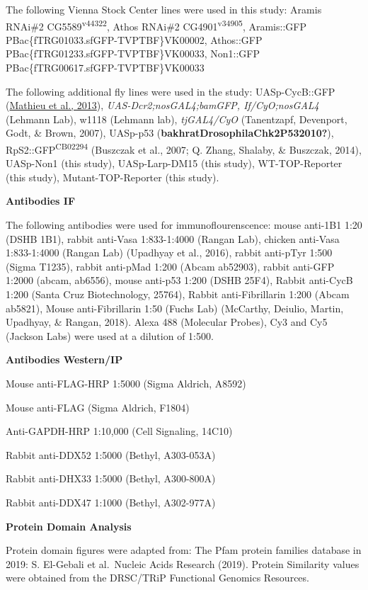 \documentclass[12pt,oneside]{reedthesis}
\begin{document}
The following Vienna Stock Center lines were used in this study: Aramis
RNAi\#2 CG5589\textsuperscript{v44322}, Athos RNAi\#2 CG4901\textsuperscript{v34905}, Aramis::GFP
PBac\{fTRG01033.sfGFP-TVPTBF\}VK00002, Athos::GFP
PBac\{fTRG01233.sfGFP-TVPTBF\}VK00033, Non1::GFP
PBac\{fTRG00617.sfGFP-TVPTBF\}VK00033

The following additional fly lines were used in the study:
UASp-CycB::GFP (\href{https://www.ncbi.nlm.nih.gov/pmc/articles/PMC5830152/\#R25}{Mathieu et al.,
2013}),
\emph{UAS-Dcr2;nosGAL4;bamGFP, If/CyO;nosGAL4} (Lehmann Lab), w1118 (Lehmann
lab),
\emph{tjGAL4/CyO} (Tanentzapf, Devenport, Godt, \& Brown, 2007),
UASp-p53 (\textbf{bakhratDrosophilaChk2P532010?}), RpS2::GFP\textsuperscript{CB02294}
(Buszczak et al., 2007; Q. Zhang, Shalaby, \& Buszczak, 2014), UASp-Non1 (this
study), UASp-Larp-DM15 (this study), WT-TOP-Reporter (this study),
Mutant-TOP-Reporter (this study).

\textbf{Antibodies IF}

The following antibodies were used for immunoflourenscence: mouse
anti-1B1 1:20 (DSHB 1B1), rabbit anti-Vasa 1:833-1:4000 (Rangan Lab),
chicken anti-Vasa 1:833-1:4000 (Rangan Lab)
(Upadhyay et al., 2016), rabbit anti-pTyr
1:500 (Sigma T1235), rabbit anti-pMad 1:200 (Abcam ab52903), rabbit
anti-GFP 1:2000 (abcam, ab6556), mouse anti-p53 1:200 (DSHB 25F4),
Rabbit anti-CycB 1:200 (Santa Cruz Biotechnology, 25764), Rabbit
anti-Fibrillarin 1:200 (Abcam ab5821), Mouse anti-Fibrillarin 1:50
(Fuchs Lab) (McCarthy, Deiulio, Martin, Upadhyay, \& Rangan, 2018). Alexa 488 (Molecular Probes), Cy3 and
Cy5 (Jackson Labs) were used at a dilution of 1:500.

\textbf{Antibodies Western/IP}

Mouse anti-FLAG-HRP 1:5000 (Sigma Aldrich, A8592)

Mouse anti-FLAG (Sigma Aldrich, F1804)

Anti-GAPDH-HRP 1:10,000 (Cell Signaling, 14C10)

Rabbit anti-DDX52 1:5000 (Bethyl, A303-053A)

Rabbit anti-DHX33 1:5000 (Bethyl, A300-800A)

Rabbit anti-DDX47 1:1000 (Bethyl, A302-977A)

\textbf{Protein Domain Analysis}

Protein domain figures were adapted from: The Pfam protein families
database in 2019: S. El-Gebali et al.~Nucleic Acids Research (2019).
Protein Similarity values were obtained from the DRSC/TRiP Functional
Genomics Resources.
\end{document}
